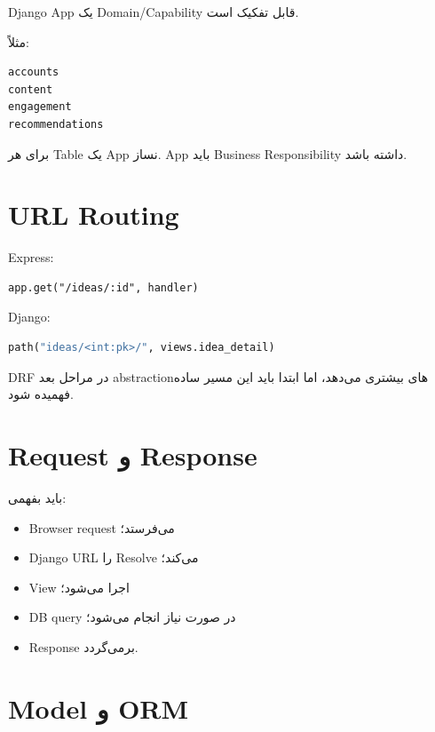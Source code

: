 Django App یک Domain/Capability قابل تفکیک است.

مثلاً:
\begin{latin}
\begin{lstlisting}
accounts
content
engagement
recommendations
\end{lstlisting}
\end{latin}

\begin{warningbox}
برای هر Table یک App نساز. App باید Business Responsibility داشته باشد.
\end{warningbox}

\section{URL Routing}

Express:
\begin{latin}
\begin{lstlisting}
app.get("/ideas/:id", handler)
\end{lstlisting}
\end{latin}

Django:
\begin{latin}
\begin{lstlisting}[language=Python]
path("ideas/<int:pk>/", views.idea_detail)
\end{lstlisting}
\end{latin}

DRF در مراحل بعد abstractionهای بیشتری می‌دهد، اما ابتدا باید این مسیر ساده فهمیده شود.

\section{Request و Response}

باید بفهمی:
\begin{itemize}
  \item Browser request می‌فرستد؛
  \item Django URL را Resolve می‌کند؛
  \item View اجرا می‌شود؛
  \item DB query در صورت نیاز انجام می‌شود؛
  \item Response برمی‌گردد.
\end{itemize}

\section{Model و ORM}

